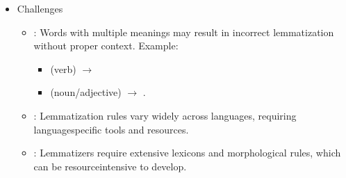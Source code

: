 \documentclass[letterpaper,11pt,english]{sphinxmanual}
\begin{document}
\begin{itemize}
\begin{enumerate}
\item {} 
\sphinxAtStartPar
{}:
\sphinxhyphen{} Uses probabilistic models to predict lemmas based on the context.

\item {} 
\sphinxAtStartPar
{}:
\sphinxhyphen{} Employs neural networks and sequence\sphinxhyphen{}to\sphinxhyphen{}sequence models for highly accurate lemmatization in complex contexts.

\end{enumerate}

\item {} 
\sphinxAtStartPar
Challenges
\begin{itemize}
\item {} 
\sphinxAtStartPar
{}:
Words with multiple meanings may result in incorrect lemmatization without proper context.
\sphinxhyphen{} Example:
\begin{itemize}
\item {} 
\sphinxAtStartPar
{} (verb) \(\rightarrow\) 

\item {} 
\sphinxAtStartPar
{} (noun/adjective) \(\rightarrow\) .

\end{itemize}

\item {} 
\sphinxAtStartPar
{}:
Lemmatization rules vary widely across languages, requiring language\sphinxhyphen{}specific tools and resources.

\item {} 
\sphinxAtStartPar
{}:
Lemmatizers require extensive lexicons and morphological rules, which can be resource\sphinxhyphen{}intensive to develop.

\end{itemize}

\end{itemize}
\end{document}
